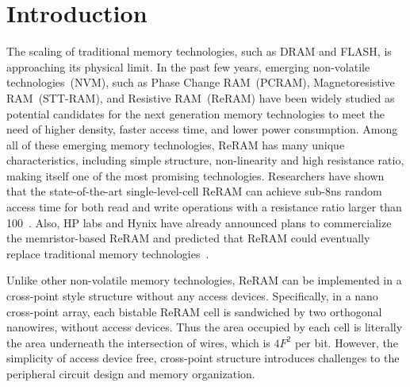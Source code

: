 \section{Introduction}\label{sec:intro}
The scaling of traditional memory technologies, such as %
DRAM and FLASH, is approaching its %
physical limit.
In the past few years, emerging non-volatile technologies~(NVM), such as Phase Change RAM~(PCRAM), Magnetoresistive RAM~(STT-RAM), and Resistive RAM~(ReRAM) have been widely studied as potential candidates for the next generation memory technologies to meet the need of higher density, faster access time, and lower power consumption. Among all of these emerging memory technologies, ReRAM has many unique characteristics, including simple structure, non-linearity and high resistance ratio, making itself one of the most promising technologies. Researchers have shown that the state-of-the-art single-level-cell ReRAM can achieve sub-8ns random access time for both read and write operations with a resistance ratio larger than 100~\cite{ReRAM_ISSCC2011_Sheu}. Also, HP labs and Hynix have already announced plans to commercialize the memristor-based ReRAM and predicted that ReRAM could eventually replace traditional memory technologies~\cite{memristor:HpHynix}.

Unlike other non-volatile memory technologies, ReRAM can be implemented in a cross-point style structure without any access devices. Specifically, in a nano cross-point array, each bistable ReRAM cell is sandwiched by two orthogonal nanowires, without access devices. Thus the area occupied by each cell is literally the area underneath the intersection of wires, which is $4F^2$ per bit.
However, the simplicity of access device free, cross-point structure introduces challenges to the peripheral circuit design and memory organization.

